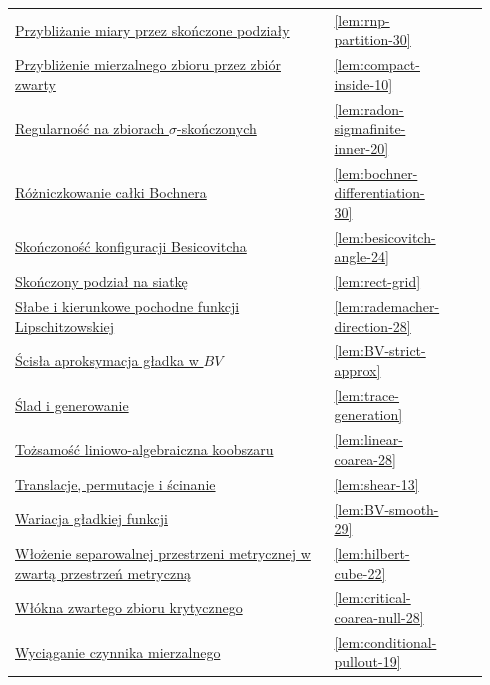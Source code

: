 \documentclass[11pt,a4paper,oneside]{book}
\numberwithin{equation}{chapter}
\theoremstyle{plain}
\theoremstyle{definition}
\theoremstyle{remark}
\begin{document}
\begin{longtable}{@{}p{0.72\linewidth}p{0.135\linewidth}p{0.08\linewidth}@{}}
\hyperref[lem:rnp-partition-30]{Przybliżanie miary przez skończone podziały} & \ref*{lem:rnp-partition-30} & \pageref*{lem:rnp-partition-30} \\
\hyperref[lem:compact-inside-10]{Przybliżenie mierzalnego zbioru przez zbiór zwarty} & \ref*{lem:compact-inside-10} & \pageref*{lem:compact-inside-10} \\
\hyperref[lem:radon-sigmafinite-inner-20]{Regularność na zbiorach $\sigma$-skończonych} & \ref*{lem:radon-sigmafinite-inner-20} & \pageref*{lem:radon-sigmafinite-inner-20} \\
\hyperref[lem:bochner-differentiation-30]{Różniczkowanie całki Bochnera} & \ref*{lem:bochner-differentiation-30} & \pageref*{lem:bochner-differentiation-30} \\
\hyperref[lem:besicovitch-angle-24]{Skończoność konfiguracji Besicovitcha} & \ref*{lem:besicovitch-angle-24} & \pageref*{lem:besicovitch-angle-24} \\
\hyperref[lem:rect-grid]{Skończony podział na siatkę} & \ref*{lem:rect-grid} & \pageref*{lem:rect-grid} \\
\hyperref[lem:rademacher-direction-28]{Słabe i kierunkowe pochodne funkcji Lipschitzowskiej} & \ref*{lem:rademacher-direction-28} & \pageref*{lem:rademacher-direction-28} \\
\hyperref[lem:BV-strict-approx]{Ścisła aproksymacja gładka w $BV$} & \ref*{lem:BV-strict-approx} & \pageref*{lem:BV-strict-approx} \\
\hyperref[lem:trace-generation]{Ślad i generowanie} & \ref*{lem:trace-generation} & \pageref*{lem:trace-generation} \\
\hyperref[lem:linear-coarea-28]{Tożsamość liniowo-algebraiczna koobszaru} & \ref*{lem:linear-coarea-28} & \pageref*{lem:linear-coarea-28} \\
\hyperref[lem:shear-13]{Translacje, permutacje i ścinanie} & \ref*{lem:shear-13} & \pageref*{lem:shear-13} \\
\hyperref[lem:BV-smooth-29]{Wariacja gładkiej funkcji} & \ref*{lem:BV-smooth-29} & \pageref*{lem:BV-smooth-29} \\
\hyperref[lem:hilbert-cube-22]{Włożenie separowalnej przestrzeni metrycznej w zwartą przestrzeń metryczną} & \ref*{lem:hilbert-cube-22} & \pageref*{lem:hilbert-cube-22} \\
\hyperref[lem:critical-coarea-null-28]{Włókna zwartego zbioru krytycznego} & \ref*{lem:critical-coarea-null-28} & \pageref*{lem:critical-coarea-null-28} \\
\hyperref[lem:conditional-pullout-19]{Wyciąganie czynnika mierzalnego} & \ref*{lem:conditional-pullout-19} & \pageref*{lem:conditional-pullout-19} \\

\end{longtable}
\end{document}
